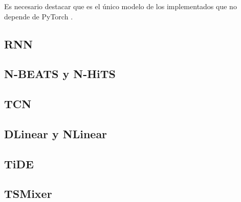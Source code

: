 Es necesario destacar que es el único modelo de los implementados que no depende de PyTorch \cite{pytorch}.

\subsection{RNN}
\subsection{N-BEATS y N-HiTS}
\subsection{TCN}
\subsection{DLinear y NLinear}
\subsection{TiDE}
\subsection{TSMixer}